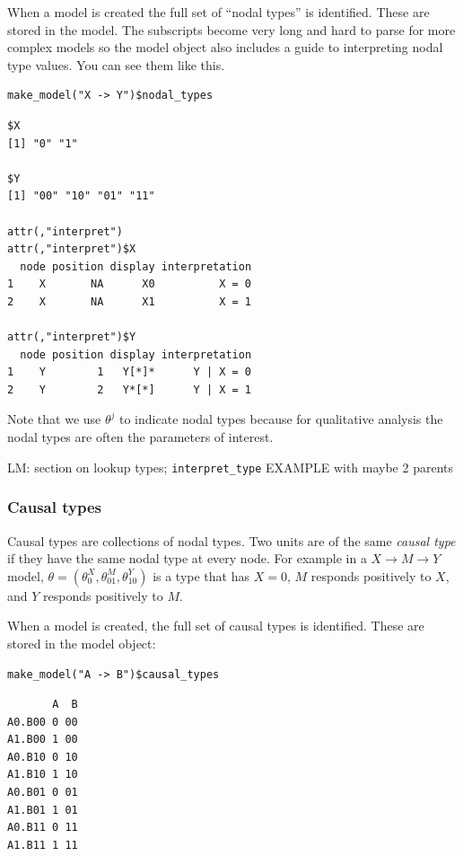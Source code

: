 \documentclass[
  article]{jss}
\begin{document}
When a model is created the full set of ``nodal types'' is identified.
These are stored in the model. The subscripts become very long and hard
to parse for more complex models so the model object also includes a
guide to interpreting nodal type values. You can see them like this.

\begin{verbatim}
make_model("X -> Y")$nodal_types
\end{verbatim}

\begin{verbatim}
$X
[1] "0" "1"

$Y
[1] "00" "10" "01" "11"

attr(,"interpret")
attr(,"interpret")$X
  node position display interpretation
1    X       NA      X0          X = 0
2    X       NA      X1          X = 1

attr(,"interpret")$Y
  node position display interpretation
1    Y        1   Y[*]*      Y | X = 0
2    Y        2   Y*[*]      Y | X = 1
\end{verbatim}

Note that we use \(\theta^j\) to indicate nodal types because for
qualitative analysis the nodal types are often the parameters of
interest.

LM: section on lookup types; \texttt{interpret\_type} EXAMPLE with maybe
2 parents

\hypertarget{causal-types}{%
\subsubsection{Causal types}\label{causal-types}}

Causal types are collections of nodal types. Two units are of the same
\emph{causal type} if they have the same nodal type at every node. For
example in a \(X \rightarrow M \rightarrow Y\) model,
\(\theta = (\theta^X_0, \theta^M_{01}, \theta^Y_{10})\) is a type that
has \(X=0\), \(M\) responds positively to \(X\), and \(Y\) responds
positively to \(M\).

When a model is created, the full set of causal types is identified.
These are stored in the model object:

\begin{verbatim}
make_model("A -> B")$causal_types
\end{verbatim}

\begin{verbatim}
       A  B
A0.B00 0 00
A1.B00 1 00
A0.B10 0 10
A1.B10 1 10
A0.B01 0 01
A1.B01 1 01
A0.B11 0 11
A1.B11 1 11
\end{verbatim}
\end{document}
